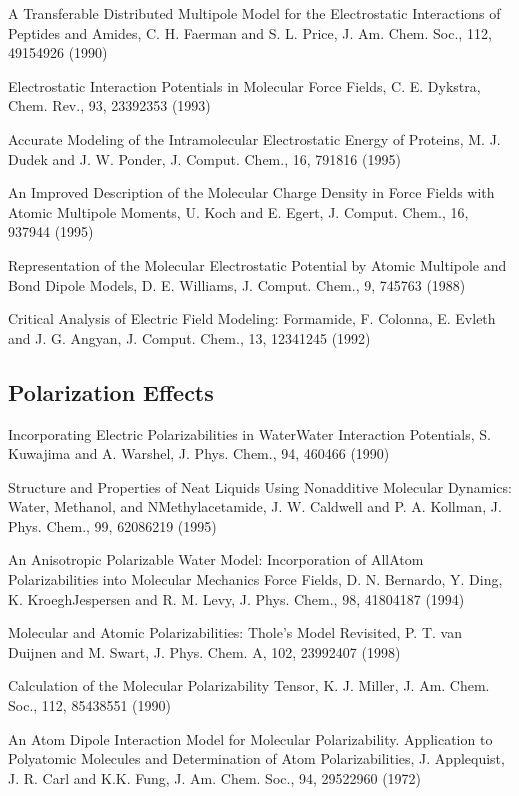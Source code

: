 \documentclass[letterpaper,11pt,english]{sphinxmanual}
\begin{document}
A Transferable Distributed Multipole Model for the Electrostatic Interactions of Peptides and Amides, C. H. Faerman and S. L. Price, J. Am. Chem. Soc., 112, 4915\sphinxhyphen{}4926 (1990)

Electrostatic Interaction Potentials in Molecular Force Fields, C. E. Dykstra, Chem. Rev., 93, 2339\sphinxhyphen{}2353 (1993)

Accurate Modeling of the Intramolecular Electrostatic Energy of Proteins, M. J. Dudek and J. W. Ponder, J. Comput. Chem., 16, 791\sphinxhyphen{}816 (1995)

An Improved Description of the Molecular Charge Density in Force Fields with Atomic Multipole Moments, U. Koch and E. Egert, J. Comput. Chem., 16, 937\sphinxhyphen{}944 (1995)

Representation of the Molecular Electrostatic Potential by Atomic Multipole and Bond Dipole Models, D. E. Williams, J. Comput. Chem., 9, 745\sphinxhyphen{}763 (1988)

Critical Analysis of Electric Field Modeling: Formamide, F. Colonna, E. Evleth and J. G. Angyan, J. Comput. Chem., 13, 1234\sphinxhyphen{}1245 (1992)


\subsection{Polarization Effects}
\label{\detokenize{text/references:polarization-effects}}
Incorporating Electric Polarizabilities in Water\sphinxhyphen{}Water Interaction Potentials, S. Kuwajima and A. Warshel, J. Phys. Chem., 94, 460\sphinxhyphen{}466 (1990)

Structure and Properties of Neat Liquids Using Nonadditive Molecular Dynamics: Water, Methanol, and N\sphinxhyphen{}Methylacetamide, J. W. Caldwell and P. A. Kollman, J. Phys. Chem., 99, 6208\sphinxhyphen{}6219 (1995)

An Anisotropic Polarizable Water Model: Incorporation of All\sphinxhyphen{}Atom Polarizabilities into Molecular Mechanics Force Fields, D. N. Bernardo, Y. Ding, K. Kroegh\sphinxhyphen{}Jespersen and R. M. Levy, J. Phys. Chem., 98, 4180\sphinxhyphen{}4187 (1994)

Molecular and Atomic Polarizabilities: Thole’s Model Revisited, P. T. van Duijnen and M. Swart, J. Phys. Chem. A, 102, 2399\sphinxhyphen{}2407 (1998)

Calculation of the Molecular Polarizability Tensor, K. J. Miller, J. Am. Chem. Soc., 112, 8543\sphinxhyphen{}8551 (1990)

An Atom Dipole Interaction Model for Molecular Polarizability. Application to Polyatomic Molecules and Determination of Atom Polarizabilities, J. Applequist, J. R. Carl and K.\sphinxhyphen{}K. Fung, J. Am. Chem. Soc., 94, 2952\sphinxhyphen{}2960 (1972)
\end{document}
